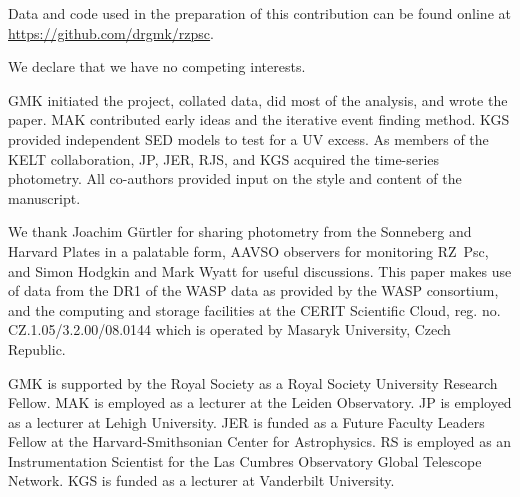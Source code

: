 \documentclass[]{rsos}
\begin{document}
\ack{}

Data and code used in the preparation of this contribution can be found online at
\href{https://github.com/drgmk/rzpsc}{https://github.com/drgmk/rzpsc}.

We declare that we have no competing interests.

GMK initiated the project, collated data, did most of the analysis, and wrote the
paper. MAK contributed early ideas and the iterative event finding method. KGS provided
independent SED models to test for a UV excess. As members of the KELT collaboration, JP,
JER, RJS, and KGS acquired the time-series photometry. All co-authors provided input on
the style and content of the manuscript.

We thank Joachim G\"urtler for sharing photometry from the Sonneberg and Harvard Plates
in a palatable form, AAVSO observers for monitoring RZ~Psc, and Simon Hodgkin and Mark
Wyatt for useful discussions. This paper makes use of data from the DR1 of the WASP data
\cite{2010A&A...520L..10B} as provided by the WASP consortium, and the computing and
storage facilities at the CERIT Scientific Cloud, reg. no. CZ.1.05/3.2.00/08.0144 which
is operated by Masaryk University, Czech Republic.

GMK is supported by the Royal Society as a Royal Society University Research Fellow. MAK
is employed as a lecturer at the Leiden Observatory. JP is employed as a lecturer at
Lehigh University. JER is funded as a Future Faculty Leaders Fellow at the
Harvard-Smithsonian Center for Astrophysics. RS is employed as an Instrumentation
Scientist for the Las Cumbres Observatory Global Telescope Network. KGS is funded as a
lecturer at Vanderbilt University.

% 
\end{document}
